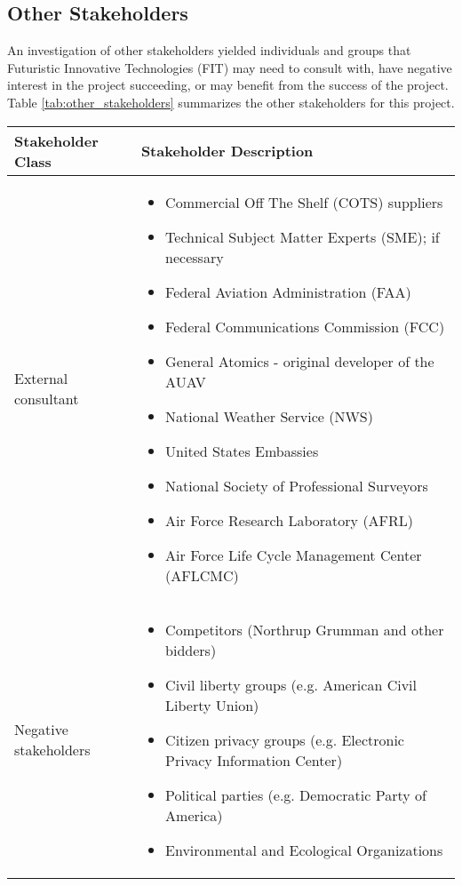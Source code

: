 \begin{fullwidth}
\subsection{Other Stakeholders}
    An investigation of other stakeholders yielded individuals and groups that Futuristic Innovative Technologies (FIT) may need to consult with, have negative interest in the project succeeding, or may benefit from the success of the project. Table \ref{tab:other_stakeholders} summarizes the other stakeholders for this project.
    \begin{longtable}{ | p{5cm} | p{12cm} | }
        \hline
        Stakeholder Class &  Stakeholder Description \\
        \hline
        External consultant & 
        \begin{itemize}
            \item Commercial Off The Shelf (COTS) suppliers
            \item Technical Subject Matter Experts (SME); if necessary
            \item Federal Aviation Administration (FAA)
            \item Federal Communications Commission (FCC)
            \item General Atomics - original developer of the AUAV
            \item National Weather Service (NWS)
            \item United States Embassies
            \item National Society of Professional Surveyors
            \item Air Force Research Laboratory (AFRL)
            \item Air Force Life Cycle Management Center (AFLCMC)
        \end{itemize} \\
        \hline
        Negative stakeholders &
        \begin{itemize}
            \item Competitors (Northrup Grumman and other bidders)
            \item Civil liberty groups (e.g. American Civil Liberty Union)
            \item Citizen privacy groups (e.g. Electronic Privacy Information Center)
            \item Political parties (e.g. Democratic Party of America)
            \item Environmental and Ecological Organizations
        \end{itemize} \\

\end{longtable}
\end{fullwidth}
